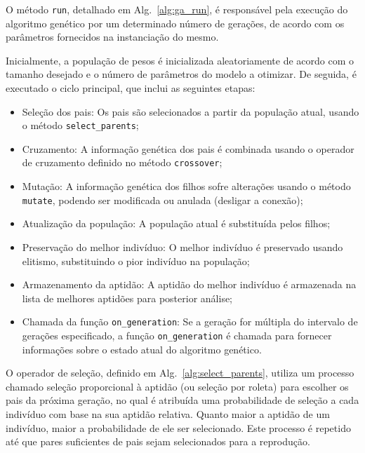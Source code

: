 O método \texttt{run}, detalhado em Alg.~\ref{alg:ga_run}, é responsável pela execução do algoritmo genético por um determinado número de gerações, de acordo com os parâmetros fornecidos na instanciação do mesmo.

Inicialmente, a população de pesos é inicializada aleatoriamente de acordo com o tamanho desejado e o número de parâmetros do modelo a otimizar. De seguida, é executado o ciclo principal, que inclui as seguintes etapas:
\begin{itemize}
    \item Seleção dos pais: Os pais são selecionados a partir da população atual, usando o método \texttt{select\_parents};
    \item Cruzamento: A informação genética dos pais é combinada usando o operador de cruzamento definido no método \texttt{crossover};
    \item Mutação: A informação genética dos filhos sofre alterações usando o método \texttt{mutate}, podendo ser modificada ou anulada (desligar a conexão);
    \item Atualização da população: A população atual é substituída pelos filhos;
    \item Preservação do melhor indivíduo: O melhor indivíduo é preservado usando elitismo, substituindo o pior indivíduo na população;
    \item Armazenamento da aptidão: A aptidão do melhor indivíduo é armazenada na lista de melhores aptidões para posterior análise;
    \item Chamada da função \texttt{on\_generation}: Se a geração for múltipla do intervalo de gerações especificado, a função \texttt{on\_generation} é chamada para fornecer informações sobre o estado atual do algoritmo genético.
\end{itemize}

O operador de seleção, definido em Alg.~\ref{alg:select_parents}, utiliza um processo chamado seleção proporcional à aptidão (ou seleção por roleta) para escolher os pais da próxima geração, no qual é atribuída uma probabilidade de seleção a cada indivíduo com base na sua aptidão relativa. Quanto maior a aptidão de um indivíduo, maior a probabilidade de ele ser selecionado. Este processo é repetido até que pares suficientes de pais sejam selecionados para a reprodução.

